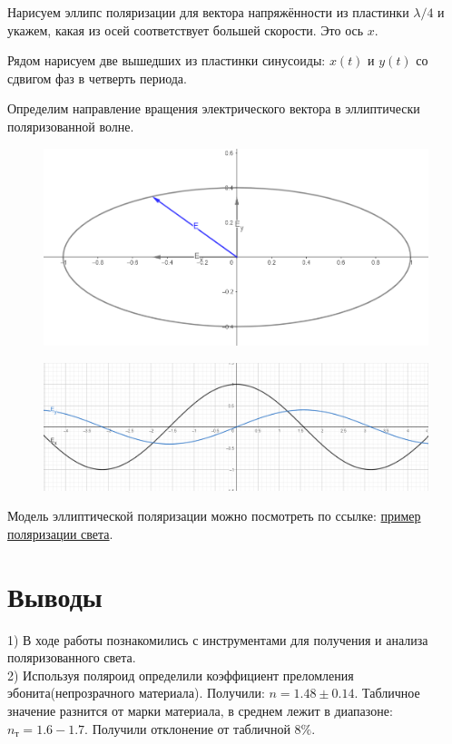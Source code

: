 \documentclass[a4paper, 12pt]{article}%
\begin{document}
	Нарисуем эллипс поляризации для вектора напряжённости из пластинки $ \lambda/4 $ и укажем, какая из осей соответствует большей скорости. Это ось $ x $.
	
	Рядом нарисуем две вышедших из пластинки синусоиды: $ x(t) $ и $ y(t) $ со сдвигом фаз в четверть периода. 
	
	Определим направление вращения электрического вектора в эллиптически поляризованной волне.
		\begin{figure}[H]
		\centering
		\begin{minipage}{.5\textwidth}
			\centering
			\includegraphics[width=0.98\linewidth]{ellyps.png}
			\label{1}
		\end{minipage}%
		\begin{minipage}{.5\textwidth}
			\centering
			\includegraphics[width=0.98\linewidth]{wave.png}
			\label{2}
		\end{minipage}
	\end{figure}
	Модель эллиптической поляризации можно посмотреть по ссылке: \href{https://www.geogebra.org/m/eeyyjg6d}{пример поляризации света}.
	\section{Выводы}
	1) В ходе работы познакомились с инструментами для получения и анализа поляризованного света.\\
	2) Используя поляроид определили коэффициент преломления эбонита(непрозрачного материала). Получили: $n = 1.48 \pm 0.14$. Табличное значение разнится от марки материала, в среднем лежит в диапазоне: $n_{т} =1.6 - 1.7$. Получили отклонение от табличной $8 \%$.
	
\end{document}

